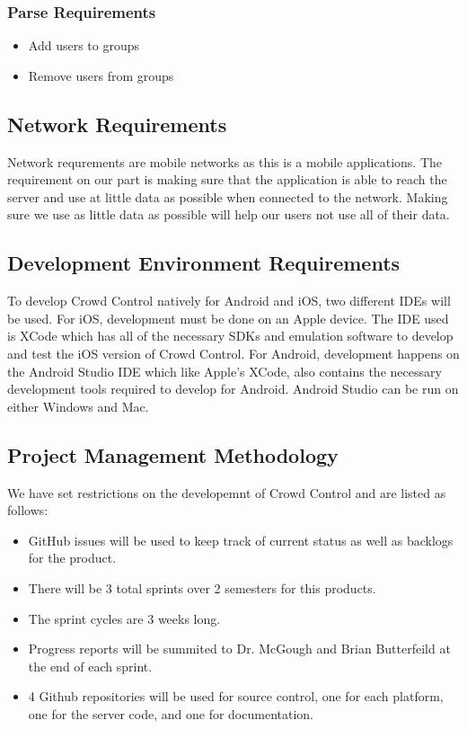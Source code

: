\subsubsection{Parse Requirements}
\begin{itemize}
\item{Add users to groups}
\item{Remove users from groups}
\end{itemize}

\subsection{Network Requirements}

Network requrements are mobile networks as this is a mobile applications. The requirement on our part is making sure that the application is able to reach the server and use at little data as possible when connected to the network. Making sure we use as little data as possible will help our users not use all of their data. 

\subsection{Development Environment Requirements}
To develop Crowd Control natively for Android and iOS, two different IDEs will be used.  For iOS, development must be done on an Apple device.  The IDE used is XCode which has all of the necessary SDKs and emulation software to develop and test the iOS version of Crowd Control.  For Android, development happens on the Android Studio IDE which like Apple's XCode, also contains the necessary development tools required to develop for Android.  Android Studio can be run on either  Windows and Mac. 

\subsection{Project  Management Methodology}

We have set restrictions on the developemnt of Crowd Control and are listed as follows:
 
\begin{itemize}
\item GitHub issues will be used to keep track of current status as well as backlogs for the product.
\item There will be 3 total sprints over 2 semesters for this products.
\item The sprint cycles are 3 weeks long.
\item Progress reports will be summited to Dr. McGough and Brian Butterfeild at the end of each sprint.
\item 4 Github repositories will be used for source control, one for each platform, one for the server code, and one for documentation. 
\end{itemize}


